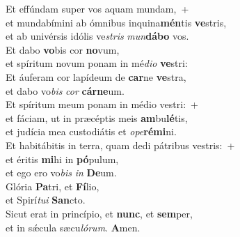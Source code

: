 \evenverse Et effúndam super vos aquam mundam,~+\\\evenverse  et mundabímini ab ómnibus inquina\textbf{mén}tis \textbf{ve}stris,~\*\\
\evenverse et ab univérsis idólis ve\textit{stris} \textit{mun}\textbf{dá}\textbf{bo} vos.\\
\oddverse Et dabo \textbf{vo}bis cor \textbf{no}vum,~\*\\
\oddverse et spíritum novum ponam in mé\textit{di}\textit{o} \textbf{ve}stri:\\
\evenverse Et áuferam cor lapídeum de \textbf{car}ne \textbf{ve}stra,~\*\\
\evenverse et dabo vo\textit{bis} \textit{cor} \textbf{cár}\textbf{ne}um.\\
\oddverse Et spíritum meum ponam in médio vestri:~+\\
\oddverse  et fáciam, ut in præcéptis meis \textbf{am}bu\textbf{lé}tis,~\*\\
\oddverse et judícia mea custodiátis et \textit{o}\textit{pe}\textbf{ré}\textbf{mi}ni.\\
\evenverse Et habitábitis in terra, quam dedi pátribus vestris:~+\\
\evenverse  et éritis \textbf{mi}hi in \textbf{pó}pulum,~\*\\
\evenverse et ego ero vo\textit{bis} \textit{in} \textbf{De}um.\\
\oddverse Glória \textbf{Pa}tri, et \textbf{Fí}lio,~\*\\
\oddverse et Spirí\textit{tu}\textit{i} \textbf{San}cto.\\
\evenverse Sicut erat in princípio, et \textbf{nunc}, et \textbf{sem}per,~\*\\
\evenverse et in sǽcula sæcu\textit{ló}\textit{rum}. \textbf{A}men.\\
